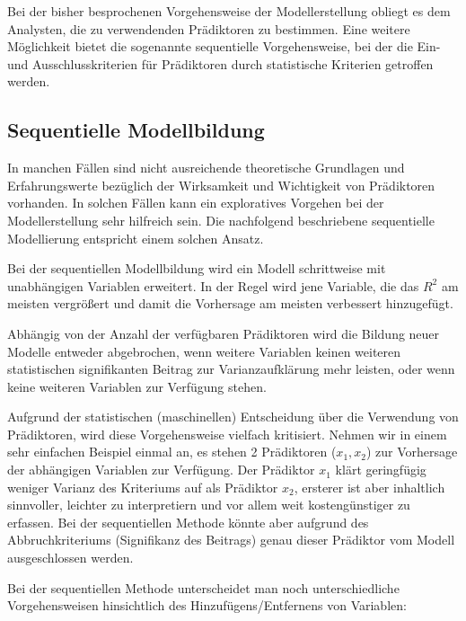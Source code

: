 \documentclass[]{article}
\begin{document}
Bei der bisher besprochenen Vorgehensweise der Modellerstellung obliegt
es dem Analysten, die zu verwendenden Prädiktoren zu bestimmen. Eine
weitere Möglichkeit bietet die sogenannte sequentielle Vorgehensweise,
bei der die Ein- und Ausschlusskriterien für Prädiktoren durch
statistische Kriterien getroffen werden.

\subsection*{Sequentielle
Modellbildung}\label{sequentielle-modellbildung}

In manchen Fällen sind nicht ausreichende theoretische Grundlagen und
Erfahrungswerte bezüglich der Wirksamkeit und Wichtigkeit von
Prädiktoren vorhanden. In solchen Fällen kann ein exploratives Vorgehen
bei der Modellerstellung sehr hilfreich sein. Die nachfolgend
beschriebene sequentielle Modellierung entspricht einem solchen Ansatz.

Bei der sequentiellen Modellbildung wird ein Modell schrittweise mit
unabhängigen Variablen erweitert. In der Regel wird jene Variable, die
das \(R^2\) am meisten vergrößert und damit die Vorhersage am meisten
verbessert hinzugefügt.

Abhängig von der Anzahl der verfügbaren Prädiktoren wird die Bildung
neuer Modelle entweder abgebrochen, wenn weitere Variablen keinen
weiteren statistischen signifikanten Beitrag zur Varianzaufklärung mehr
leisten, oder wenn keine weiteren Variablen zur Verfügung stehen.

Aufgrund der statistischen (maschinellen) Entscheidung über die
Verwendung von Prädiktoren, wird diese Vorgehensweise vielfach
kritisiert. Nehmen wir in einem sehr einfachen Beispiel einmal an, es
stehen 2 Prädiktoren (\(x_1, x_2\)) zur Vorhersage der abhängigen
Variablen zur Verfügung. Der Prädiktor \(x_1\) klärt geringfügig weniger
Varianz des Kriteriums auf als Prädiktor \(x_2\), ersterer ist aber
inhaltlich sinnvoller, leichter zu interpretiern und vor allem weit
kostengünstiger zu erfassen. Bei der sequentiellen Methode könnte aber
aufgrund des Abbruchkriteriums (Signifikanz des Beitrags) genau dieser
Prädiktor vom Modell ausgeschlossen werden.

Bei der sequentiellen Methode unterscheidet man noch unterschiedliche
Vorgehensweisen hinsichtlich des Hinzufügens/Entfernens von Variablen:
\end{document}
